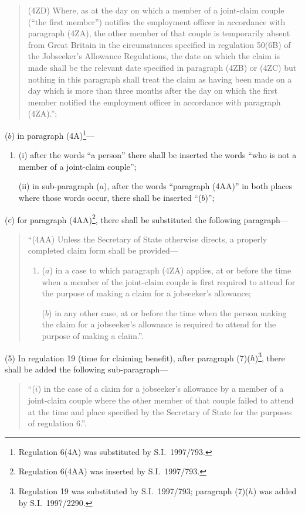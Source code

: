 \documentclass[12pt,a4paper]{article}
\begin{document}
\begin{enumerate}
\begin{quotation}
(4ZD) Where, as at the day on which a member of a joint-claim couple (“the first member”) notifies the employment officer in accordance with paragraph (4ZA), the other member of that couple is temporarily absent from Great Britain in the circumstances specified in regulation 50(6B) of the Jobseeker’s Allowance Regulations, the date on which the claim is made shall be the relevant date specified in paragraph (4ZB) or (4ZC) but nothing in this paragraph shall treat the claim as having been made on a day which is more than three months after the day on which the first member notified the employment officer in accordance with paragraph (4ZA).”;
\end{quotation}

($b$) in paragraph (4A)\footnote{Regulation 6(4A) was substituted by S.I.\ 1997/793.}—
\begin{enumerate}\item[]
(i) after the words “a person” there shall be inserted the words “who is not a member of a joint-claim couple”;

(ii) in sub-paragraph ($a$), after the words “paragraph (4AA)” in both places where those words occur, there shall be inserted “($b$)”;
\end{enumerate}

($c$) for paragraph (4AA)\footnote{Regulation 6(4AA) was inserted by S.I.\ 1997/793.}, there shall be substituted the following paragraph—
\begin{quotation}
“(4AA) Unless the Secretary of State otherwise directs, a properly completed claim form shall be provided—
\begin{enumerate}\item[]
($a$) in a case to which paragraph (4ZA) applies, at or before the time when a member of the joint-claim couple is first required to attend for the purpose of making a claim for a jobseeker’s allowance;

($b$) in any other case, at or before the time when the person making the claim for a jobseeker’s allowance is required to attend for the purpose of making a claim.”.
\end{enumerate}
\end{quotation}
\end{enumerate}

(5) In regulation 19 (time for claiming benefit), after paragraph (7)($h$)\footnote{Regulation 19 was substituted by S.I.\ 1997/793; paragraph (7)($h$) was added by S.I.\ 1997/2290.}, there shall be added the following sub-paragraph—
\begin{quotation}
“($i$) in the case of a claim for a jobseeker’s allowance by a member of a joint-claim couple where the other member of that couple failed to attend at the time and place specified by the Secretary of State for the purposes of regulation 6.”.
\end{quotation}
\end{document}

